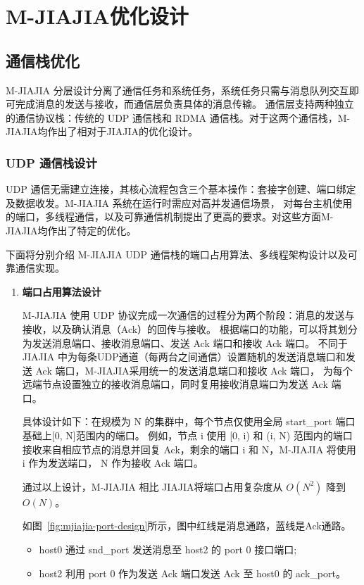 {    \section{M-JIAJIA优化设计}\label{sec:M-JIAJIA优化设计}
    \subsection{通信栈优化}
    M-JIAJIA 分层设计分离了通信任务和系统任务，系统任务只需与消息队列交互即可完成消息的发送与接收，而通信层负责具体的消息传输。
    通信层支持两种独立的通信协议栈：传统的 UDP 通信栈和 RDMA 通信栈。对于这两个通信栈，M-JIAJIA均作出了相对于JIAJIA的优化设计。

    \subsubsection{UDP 通信栈设计}
    UDP 通信无需建立连接，其核心流程包含三个基本操作：套接字创建、端口绑定及数据收发。M-JIAJIA 系统在运行时需应对高并发通信场景，
    对每台主机使用的端口，多线程通信，以及可靠通信机制提出了更高的要求。对这些方面M-JIAJIA均作出了特定的优化。

    下面将分别介绍 M-JIAJIA UDP 通信栈的端口占用算法、多线程架构设计以及可靠通信实现。
    \begin{enumerate}[label=\arabic*.]
        \item \textbf{端口占用算法设计}

              M-JIAJIA 使用 UDP 协议完成一次通信的过程分为两个阶段：消息的发送与接收，以及确认消息（Ack）的回传与接收。
              根据端口的功能，可以将其划分为发送消息端口、接收消息端口、发送 Ack 端口和接收 Ack 端口。
              不同于 JIAJIA 中为每条UDP通道（每两台之间通信）设置随机的发送消息端口和发送 Ack 端口，M-JIAJIA采用统一的发送消息端口和接收 Ack 端口，
              为每个远端节点设置独立的接收消息端口，同时复用接收消息端口为发送 Ack 端口。

              具体设计如下：在规模为 N 的集群中，每个节点仅使用全局 start\_port 端口基础上[0, N]范围内的端口。
              例如，节点 i 使用 [0, i) 和 (i, N) 范围内的端口接收来自相应节点的消息并回复 Ack，剩余的端口 i 和 N，M-JIAJIA 将使用 i 作为发送端口，
              N 作为接收 Ack 端口。

              通过以上设计，M-JIAJIA 相比 JIAJIA将端口占用复杂度从 $O(N^2)$ 降到 $O(N)$。

              如图~\ref{fig:mjiajia-port-design}所示，图中红线是消息通路，蓝线是Ack通路。
              \begin{itemize}
                  \item host0 通过 snd\_port 发送消息至 host2 的 port 0 接口端口;
                  \item host2 利用 port 0 作为发送 Ack 端口发送 Ack 至 host0 的 ack\_port。
              \end{itemize}


\end{enumerate}}
